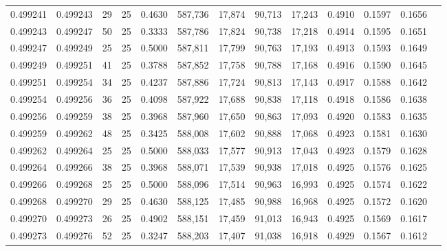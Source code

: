 \begin{tabular}{rrrrrrrrrrrrr}
0.499241 & 0.499243 &    29 &  25 &                                     0.4630 & 587,736 &  17,874 &  90,713 &  17,243 & 0.4910 & 0.1597 & 0.1656 \\
0.499243 & 0.499247 &    50 &  25 &                                     0.3333 & 587,786 &  17,824 &  90,738 &  17,218 & 0.4914 & 0.1595 & 0.1651 \\
0.499247 & 0.499249 &    25 &  25 &                                     0.5000 & 587,811 &  17,799 &  90,763 &  17,193 & 0.4913 & 0.1593 & 0.1649 \\
0.499249 & 0.499251 &    41 &  25 &                                     0.3788 & 587,852 &  17,758 &  90,788 &  17,168 & 0.4916 & 0.1590 & 0.1645 \\
0.499251 & 0.499254 &    34 &  25 &                                     0.4237 & 587,886 &  17,724 &  90,813 &  17,143 & 0.4917 & 0.1588 & 0.1642 \\
0.499254 & 0.499256 &    36 &  25 &                                     0.4098 & 587,922 &  17,688 &  90,838 &  17,118 & 0.4918 & 0.1586 & 0.1638 \\
0.499256 & 0.499259 &    38 &  25 &                                     0.3968 & 587,960 &  17,650 &  90,863 &  17,093 & 0.4920 & 0.1583 & 0.1635 \\
0.499259 & 0.499262 &    48 &  25 &                                     0.3425 & 588,008 &  17,602 &  90,888 &  17,068 & 0.4923 & 0.1581 & 0.1630 \\
0.499262 & 0.499264 &    25 &  25 &                                     0.5000 & 588,033 &  17,577 &  90,913 &  17,043 & 0.4923 & 0.1579 & 0.1628 \\
0.499264 & 0.499266 &    38 &  25 &                                     0.3968 & 588,071 &  17,539 &  90,938 &  17,018 & 0.4925 & 0.1576 & 0.1625 \\
0.499266 & 0.499268 &    25 &  25 &                                     0.5000 & 588,096 &  17,514 &  90,963 &  16,993 & 0.4925 & 0.1574 & 0.1622 \\
0.499268 & 0.499270 &    29 &  25 &                                     0.4630 & 588,125 &  17,485 &  90,988 &  16,968 & 0.4925 & 0.1572 & 0.1620 \\
0.499270 & 0.499273 &    26 &  25 &                                     0.4902 & 588,151 &  17,459 &  91,013 &  16,943 & 0.4925 & 0.1569 & 0.1617 \\
0.499273 & 0.499276 &    52 &  25 &                                     0.3247 & 588,203 &  17,407 &  91,038 &  16,918 & 0.4929 & 0.1567 & 0.1612 \\

\end{tabular}

